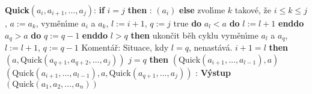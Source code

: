 {\bf Quick$\left(a_i,a_{i+1},\dots,a_j\right)$}:\newline 
{\bf if} $i=j$ {\bf then}\newline 
\phantom{---}{\bf V\'ystup}: $\left(a_i\right)$\newline 
{\bf else}\newline 
\phantom{---}zvol\'\i me $k$ takov\'e, \v ze $i\le k\le j$, $a:=a_k$,\newline 
\phantom{---}vym\v en\'\i me $a_i$ a $a_k$, $l:=i+1$, $q:=j$\newline 
\phantom{---}{\bf while} true {\bf do}\newline 
\phantom{------}{\bf while} $a_l<a$ {\bf do} $l:=l+1$ {\bf enddo}\newline 
\phantom{------}{\bf while} $a_q>a$ {\bf do} $q:=q-1$ {\bf enddo}\newline
\phantom{------}{\bf if} $l>q$ {\bf then}\newline 
\phantom{---------}ukon\v cit b\v eh cyklu\newline 
\phantom{------}{\bf else}\newline 
\phantom{---------}vym\v en\'\i me $a_l$ a $a_q$, $l:=l+1$, $q:=q-1$\newline 
\phantom{------}{\bf endif}\newline
Koment\'a\v r: Situace, kdy $l=q$, nenast\'av\'a.\newline 
\phantom{---}{\bf enddo}\newline 
\phantom{---}{\bf if} $i+1=l$ {\bf then}\newline 
\phantom{------}{\bf V\'ystup}$\left(a,\text{Quick}\left(a_{q+1},a_{q+2},\dots,a_j\right)\right)$\newline
\phantom{---}{\bf else}\newline 
\phantom{------}{\bf if} $j=q$ {\bf then}\newline 
\phantom{---------}{\bf V\'ystup}$\left(\text{Quick}\left(a_{i+1},\dots,a_{l-1}\right),a\right)$\newline \phantom{------}{\bf else}\newline 
\phantom{---------}{\bf V\'ystup}$\left(\text{Quick}\left(a_{i+1},\dots,a_{l-1}\right),a,\text{Quick}\left(a_{q+1},\dots,a_j\right)\right)$\newline 
\phantom{------}{\bf endif}\newline 
\phantom{---}{\bf endif\newline 
endif
\bigskip

QUICKSORT$\left(a_1,a_2,\dots,a_n\right)$}:\newline 
{\bf V\'ystup}$\left(\text{Quick}\left(a_1,a_2,\dots,a_n\right)\right)$
\bigskip

